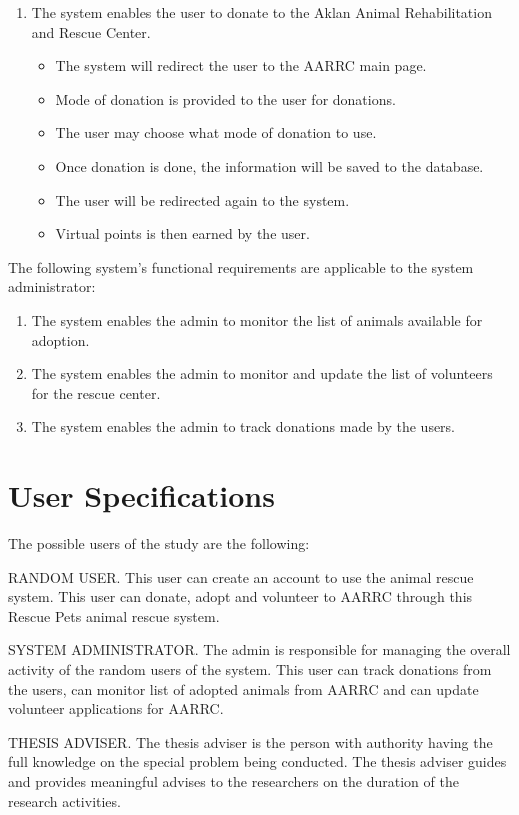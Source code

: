 \begin{enumerate}
	\item The system enables the user to donate to the Aklan Animal Rehabilitation and Rescue Center.
	
	\begin{itemize}
		\item The system will redirect the user to the AARRC main page.
		\item Mode of donation is provided to the user for donations.
		\item The user may choose what mode of donation to use. 
		\item Once donation is done, the information will be saved to the database. 
		\item The user will be redirected again to the system.
		\item Virtual points is then earned by the user.
	\end{itemize}
	
\end{enumerate}

The following system's functional requirements are applicable to the system administrator:

\begin{enumerate}
	\item The system enables the admin to monitor the list of animals available for adoption.
	\item The system enables the admin to monitor and update the list of volunteers for the rescue center.
	\item The system enables the admin to track donations made by the users. 
\end{enumerate}

\section{User Specifications}

The possible users of the study are the following:

RANDOM USER. This user can create an account to use the animal rescue system. This user can donate, adopt and volunteer to AARRC through this Rescue Pets animal rescue system. 

SYSTEM ADMINISTRATOR. The admin is responsible for managing the overall activity of the random users of the system. This user can track donations from the users, can monitor list of adopted animals from AARRC and can update volunteer applications for AARRC. 

THESIS ADVISER. The thesis adviser is the person with authority having the full knowledge on the special problem being conducted. The thesis adviser guides and provides meaningful advises to the researchers on the duration of the research activities.

